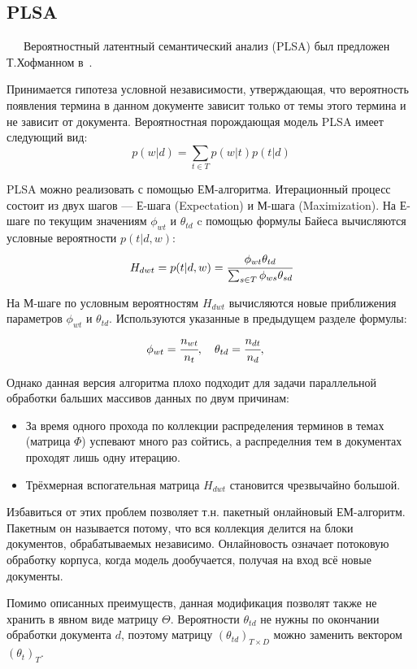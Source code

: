 
\subsection{PLSA}\label{plsa_alg}

$\quad\;\:$Вероятностный латентный семантический анализ (PLSA) был предложен Т.Хофманном в~\cite{hofmann_plsa}.

Принимается гипотеза условной независимости, утверждающая, что вероятность появления термина в данном документе зависит только от темы этого термина и не зависит от документа. Вероятностная порождающая модель PLSA имеет следующий вид: 
\begin{equation}\label{eq_generic}
	p(w|d) = \sum_{t \in T} p(w|t) p(t|d)
\end{equation}

PLSA можно реализовать с помощью ЕМ-алгоритма. Итерационный процесс состоит из двух шагов --- Е-шага (Expectation) и М-шага (Maximization). На Е-шаге по текущим значениям $\phi_{wt}$ и $\theta_{td}$ c помощью формулы Байеса вычисляются условные вероятности $p(t|d,w)$:
\[
	H_{dwt} = p(t|d,w) = \cfrac{\phi_{wt}\theta_{td}}{\sum_{s \in T}\phi_{ws}\theta_{sd}}
\]

На М-шаге по условным вероятностям $H_{dwt}$ вычисляются новые приближения параметров $\phi_{wt}$ и $\theta_{td}$. Используются указанные в предыдущем разделе формулы:
\[
	\phi_{wt} = \cfrac{n_{wt}}{n_t}, \quad
	\theta_{td} = \cfrac{n_{dt}}{n_d}, \quad	
\]

Однако данная версия алгоритма плохо подходит для задачи параллельной обработки бальших массивов данных по двум причинам:

\begin{itemize}
	\item За время одного прохода по коллекции распределения терминов в темах (матрица $\Phi$) успевают много раз сойтись, а распределния тем в документах проходят лишь одну итерацию.
	\item Трёхмерная вспогательная матрица $H_{dwt}$ становится чрезвычайно большой.
\end{itemize}

Избавиться от этих проблем позволяет т.н. пакетный онлайновый ЕМ-алгоритм. Пакетным он называется потому, что вся коллекция делится на блоки документов, обрабатываемых независимо. Онлайновость означает потоковую обработку корпуса, когда модель дообучается, получая на вход всё новые документы.

Помимо описанных преимуществ, данная модификация позволят также не хранить в явном виде матрицу $\Theta$. Вероятности $\theta_{td}$ не нужны по окончании обработки документа $d$, поэтому матрицу $(\theta_{td})_{T \times D}$ можно заменить вектором $(\theta_t)_T$.


